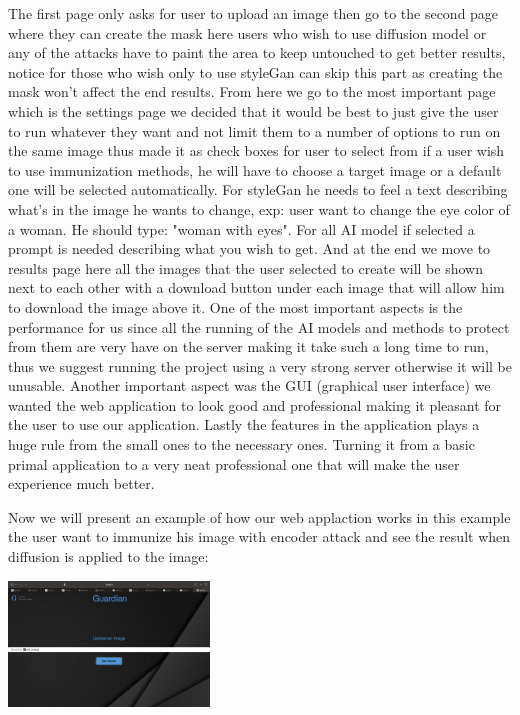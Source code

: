 \documentclass[sigconf]{acmart}
\begin{document}
The first page only asks for user to upload an image then go to the second page where they can create the mask here users who wish to use diffusion model or any of the attacks have to paint the area to keep untouched to get better results, notice for those who wish only to use styleGan can skip this part as creating the mask won't affect the end results. From here we go to the most important page which is the settings page we decided that it would be best to just give the user to run whatever they want and not limit them to a number of options to run on the same image thus made it as check boxes for user to select from if a user wish to use immunization methods, he will have to choose a target image or a default one will be selected automatically. For styleGan he needs to feel a text describing what's in the image he wants to change, exp: user want to change the eye color of a woman. He should type: "woman with eyes". For all AI model if selected a prompt is needed describing what you wish to get. And at the end we move to results page here all the images that the user selected to create will be shown next to each other with a download button under each image that will allow him to download the image above it. One of the most important aspects is the performance for us since all the running of the AI models and methods to protect from them are very have on the server making it take such a long time to run, thus we suggest running the project using a very strong server otherwise it will be unusable. Another important aspect was the GUI (graphical user interface) we wanted the web application to look good and professional making it pleasant for the user to use our application. Lastly the features in the application plays a huge rule from the small ones to the necessary ones. Turning it from a basic primal application to a very neat professional one that will make the user experience much better.

Now we will present  an example of how our web applaction works in this example the user want to immunize his image with encoder attack and see the result when diffusion is applied to the image:

\includegraphics[width=0.4\textwidth]{1}
\end{document}
